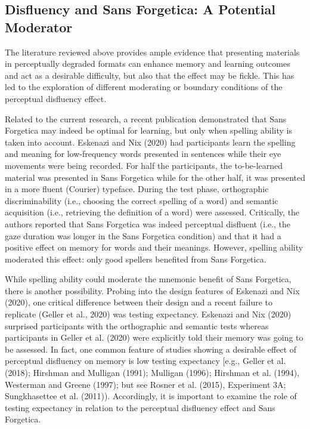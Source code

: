 \documentclass[
  english,
  jou]{apa7}
\begin{document}
\hypertarget{disfluency-and-sans-forgetica-a-potential-moderator}{%
\subsection{Disfluency and Sans Forgetica: A Potential Moderator}\label{disfluency-and-sans-forgetica-a-potential-moderator}}

The literature reviewed above provides ample evidence that presenting materials in perceptually degraded formats can enhance memory and learning outcomes and act as a desirable difficulty, but also that the effect may be fickle. This has led to the exploration of different moderating or boundary conditions of the perceptual disfluency effect.

Related to the current research, a recent publication demonstrated that Sans Forgetica may indeed be optimal for learning, but only when spelling ability is taken into account. Eskenazi and Nix (2020) had participants learn the spelling and meaning for low-frequency words presented in sentences while their eye movements were being recorded. For half the participants, the to-be-learned material was presented in Sans Forgetica while for the other half, it was presented in a more fluent (Courier) typeface. During the test phase, orthographic discriminability (i.e., choosing the correct spelling of a word) and semantic acquisition (i.e., retrieving the definition of a word) were assessed. Critically, the authors reported that Sans Forgetica was indeed perceptual disfluent (i.e., the gaze duration was longer in the Sans Forgetica condition) and that it had a positive effect on memory for words and their meanings. However, spelling ability moderated this effect: only good spellers benefited from Sans Forgetica.

While spelling ability could moderate the mnemonic benefit of Sans Forgetica, there is another possibility. Probing into the design features of Eskenazi and Nix (2020), one critical difference between their design and a recent failure to replicate (Geller et al., 2020) was testing expectancy. Eskenazi and Nix (2020) surprised participants with the orthographic and semantic tests whereas participants in Geller et al. (2020) were explicitly told their memory was going to be assessed. In fact, one common feature of studies showing a desirable effect of perceptual disfluency on memory is low testing expectancy {[}e.g., Geller et al. (2018); Hirshman and Mulligan (1991); Mulligan (1996); Hirshman et al. (1994), Westerman and Greene (1997); but see Rosner et al. (2015), Experiment 3A; Sungkhasettee et al. (2011)). Accordingly, it is important to examine the role of testing expectancy in relation to the perceptual disfluency effect and Sans Forgetica.
\end{document}
